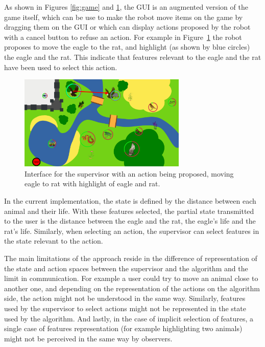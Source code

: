 \documentclass[letterpaper]{article} %
\begin{document}
As shown in Figures \ref{fig:game} and \ref{fig:gui}, the GUI is an augmented
version of the game itself, which can be use to make the robot move items on the
game by dragging them on the GUI or which can display actions proposed by the
robot with a cancel button to refuse an action. For example in
Figure~\ref{fig:gui} the robot proposes to move the eagle to the rat, and
highlight (as shown by blue circles) the eagle and the rat. This indicate that
features relevant to the eagle and the rat have been used to select this action.
\begin{figure}
        \centering
    \includegraphics[width=80mm]{./fig/proposition.png}
    \caption{Interface for the supervisor with an action being proposed, moving
        eagle to rat with highlight of eagle and rat.}
        \label{fig:gui}
\end{figure}


In the current implementation, the state is defined by the distance between each
animal and their life. With these features selected, the partial state
transmitted to the user is the distance between the eagle and the rat, the eagle's life and
the rat's life. Similarly, when selecting an action, the supervisor can 
select features in the state relevant to the action.

The main limitations of the approach reside in the difference of
representation of the state and action spaces between the supervisor and the
algorithm and the limit in communication. For example a user could try to move
an animal close to another one,
and depending on the representation of the actions on the algorithm side, the
action might not be understood in the same way. Similarly, features used by the
supervisor to select actions might not be represented in the state used by the
algorithm. And lastly, in the case of implicit selection of features, a single
case of features representation (for example highlighting two animals) might not
be perceived in the same way by observers.
\end{document}

